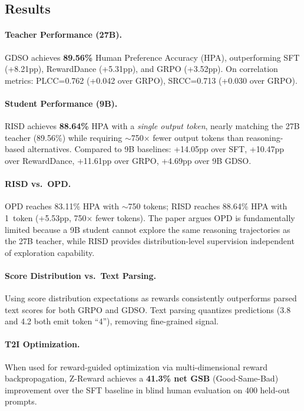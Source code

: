 \documentclass[11pt,a4paper]{article}
\begin{document}
\subsection{Results}

\paragraph{Teacher Performance (27B).} GDSO achieves \textbf{89.56\%} Human Preference Accuracy (HPA), outperforming SFT (+8.21pp), RewardDance (+5.31pp), and GRPO (+3.52pp). On correlation metrics: PLCC=0.762 (+0.042 over GRPO), SRCC=0.713 (+0.030 over GRPO).

\paragraph{Student Performance (9B).} RISD achieves \textbf{88.64\%} HPA with a \emph{single output token}, nearly matching the 27B teacher (89.56\%) while requiring $\sim$750$\times$ fewer output tokens than reasoning-based alternatives. Compared to 9B baselines: +14.05pp over SFT, +10.47pp over RewardDance, +11.61pp over GRPO, +4.69pp over 9B GDSO.

\paragraph{RISD vs.\ OPD.} OPD reaches 83.11\% HPA with $\sim$750 tokens; RISD reaches 88.64\% HPA with 1~token (+5.53pp, 750$\times$ fewer tokens). The paper argues OPD is fundamentally limited because a 9B student cannot explore the same reasoning trajectories as the 27B teacher, while RISD provides distribution-level supervision independent of exploration capability.

\paragraph{Score Distribution vs.\ Text Parsing.} Using score distribution expectations as rewards consistently outperforms parsed text scores for both GRPO and GDSO. Text parsing quantizes predictions (3.8 and 4.2 both emit token ``4''), removing fine-grained signal.

\paragraph{T2I Optimization.} When used for reward-guided optimization via multi-dimensional reward backpropagation, Z-Reward achieves a \textbf{41.3\% net GSB} (Good-Same-Bad) improvement over the SFT baseline in blind human evaluation on 400 held-out prompts.
\end{document}
